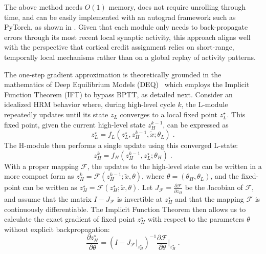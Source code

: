 The above method needs $O(1)$ memory, does not require unrolling through time, and can be easily implemented with an autograd framework such as PyTorch, as shown in . Given that each module only needs to back-propagate errors through its most recent local synaptic activity, this approach aligns well with the perspective that cortical credit assignment relies on short-range, temporally local mechanisms rather than on a global replay of activity patterns.



The one-step gradient approximation is theoretically grounded in the mathematics of Deep Equilibrium Models (DEQ)~\citep{bai2019deep} which employs the Implicit Function Theorem (IFT) to bypass BPTT, as detailed next. Consider an idealized HRM behavior where, during high-level cycle $k$, the L-module repeatedly updates until its state $z_L$ converges to a local fixed point $z_L^\star$. This fixed point, given the current high-level state $z_H^{k-1}$, can be expressed as
\begin{equation*}
    z_L^\star = f_L(z_L^\star, z_H^{k-1}, \tilde{x}; \theta_L) \;.
\end{equation*}
The H-module then performs a single update using this converged L-state:
\begin{equation*}
    z_H^k = f_H(z_H^{k-1}, z_L^\star; \theta_H) \;.
\end{equation*}
With a proper mapping $\mathcal{F}$, the updates to the high-level state can be written in a more compact form as $z_H^k = \mathcal{F}(z_H^{k-1}; \tilde{x}, \theta)$, where $\theta = (\theta_H, \theta_L)$, and the fixed-point can be written as $z_H^\star = \mathcal{F}(z_H^\star; \tilde{x}, \theta)$. Let $ J_{\mathcal{F}} = \frac{\partial \mathcal{F}}{\partial z_H}$ be the Jacobian of $\mathcal{F}$, and assume that the matrix $I - J_{\mathcal{F}}$ is invertible at $z_H^\star$ and that the mapping $\mathcal{F}$ is continuously differentiable. The Implicit Function Theorem then allows us to calculate the exact gradient of fixed point $z_H^\star$ with respect to the parameters $\theta$ without explicit backpropagation:
\begin{equation}
\label{eq:IFT-zH}
\frac{\partial z_H^\star}{\partial \theta} = \left( I - J_{\mathcal{F}} \big|_{z_H^\star} \right)^{-1} \frac{\partial \mathcal{F}}{\partial \theta} \bigg|_{z_H^\star} \;.
\end{equation}

